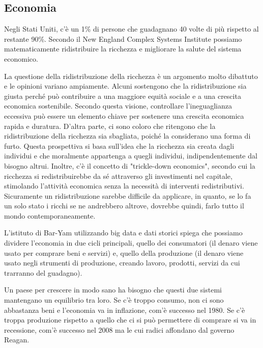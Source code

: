 \documentclass[12pt]{book} %
\begin{document}
\subsection{Economia}
Negli Stati Uniti, c'è un 1\% di persone che guadagnano 40 volte di più rispetto al restante
90\%. Secondo il New England Complex Systems Institute
possiamo matematicamente ridistribuire la ricchezza e
migliorare la salute del sistema economico.

La questione della ridistribuzione della ricchezza è un argomento molto dibattuto e le opinioni variano ampiamente. Alcuni sostengono che la ridistribuzione sia giusta perché può contribuire a una maggiore equità sociale e a una crescita economica sostenibile. Secondo questa visione, controllare l'ineguaglianza eccessiva può essere un elemento chiave per sostenere una crescita economica rapida e duratura.
D'altra parte, ci sono coloro che ritengono che la ridistribuzione della ricchezza sia sbagliata, poiché la considerano una forma di furto. Questa prospettiva si basa sull'idea che la ricchezza sia creata dagli individui e che moralmente appartenga a quegli individui, indipendentemente dal bisogno altrui. Inoltre, c'è il concetto di "trickle-down economics", secondo cui la ricchezza si redistribuirebbe da sé attraverso gli investimenti nel capitale, stimolando l'attività economica senza la necessità di interventi redistributivi.
Sicuramente un ridistribuzione sarebbe difficile da applicare, in quanto, se lo fa un solo stato i ricchi se ne andrebbero altrove, dovrebbe quindi, farlo tutto il mondo contemporaneamente.

L'istituto di Bar-Yam utilizzando big data e dati storici spiega che possiamo dividere l'economia
in due cicli principali, quello dei consumatori (il denaro viene usato per comprare beni e servizi) e, quello della
produzione (il denaro viene usato negli strumenti di produzione, creando lavoro, prodotti, servizi da cui trarranno del
guadagno).

Un paese per crescere in modo sano ha bisogno che questi due sistemi mantengano un equilibrio tra loro. Se
c'è troppo consumo, non ci sono abbastanza beni e l'economia va in inflazione,
com'è successo nel 1980.
Se c'è troppa produzione rispetto a quello che ci si può permettere di comprare si va in
recessione, com'è successo nel 2008 ma le cui radici affondano dal governo
Reagan.
\end{document}
